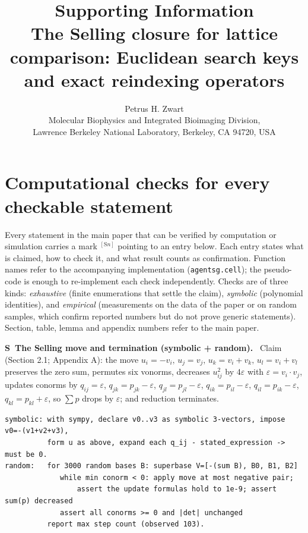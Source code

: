 \documentclass[11pt]{article}
\title{Supporting Information\\[4pt]
\large The Selling closure for lattice comparison: Euclidean search keys and exact reindexing operators}
\author{Petrus H. Zwart\\ \small Molecular Biophysics and Integrated Bioimaging Division,\\ \small Lawrence Berkeley National Laboratory, Berkeley, CA 94720, USA}
\date{}
\newcounter{scheck}
\renewcommand{\thescheck}{S\arabic{scheck}}
\newcommand{\sitem}[2]{\medskip\noindent\refstepcounter{scheck}\label{#1}\textbf{\thescheck\ #2.}\ }
\begin{document}
\sloppy
\maketitle

\section*{Computational checks for every checkable statement}

Every statement in the main paper that can be verified by computation or simulation carries a mark $^{[\mathrm{S}n]}$ pointing to an entry below. Each entry states what is claimed, how to check it, and what result counts as confirmation. Function names refer to the accompanying implementation (\texttt{agentsg.cell}); the pseudo-code is enough to re-implement each check independently. Checks are of three kinds: \emph{exhaustive} (finite enumerations that settle the claim), \emph{symbolic} (polynomial identities), and \emph{empirical} (measurements on the data of the paper or on random samples, which confirm reported numbers but do not prove generic statements). Section, table, lemma and appendix numbers refer to the main paper.

\sitem{z:reduction-step}{The Selling move and termination (symbolic + random)}
Claim (Section 2.1; Appendix A): the move $u_i=-v_i,\,u_j=v_j,\,u_k=v_i+v_k,\,u_l=v_i+v_l$ preserves the zero sum, permutes six vonorms, decreases $u_{ij}^2$ by $4\varepsilon$ with $\varepsilon=v_i\cdot v_j$, updates conorms by $q_{ij}=\varepsilon$, $q_{jk}=p_{jk}-\varepsilon$, $q_{jl}=p_{jl}-\varepsilon$, $q_{ik}=p_{il}-\varepsilon$, $q_{il}=p_{ik}-\varepsilon$, $q_{kl}=p_{kl}+\varepsilon$, so $\sum p$ drops by $\varepsilon$; and reduction terminates.
\begin{footnotesize}\begin{verbatim}
symbolic: with sympy, declare v0..v3 as symbolic 3-vectors, impose v0=-(v1+v2+v3),
          form u as above, expand each q_ij - stated_expression -> must be 0.
random:   for 3000 random bases B: superbase V=[-(sum B), B0, B1, B2]
             while min conorm < 0: apply move at most negative pair;
                 assert the update formulas hold to 1e-9; assert sum(p) decreased
             assert all conorms >= 0 and |det| unchanged
          report max step count (observed 103).
\end{verbatim}\end{footnotesize}
\end{document}
